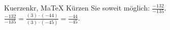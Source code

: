 \begin{MAufgabe}{Kuerzen}{kr, MaTeX}
K\"urzen Sie soweit m\"oglich: $\frac{-132}{-135}$.\\ 
\ifLsg\MLoesung
\quad $\frac{-132}{-135}=\frac{(3)\cdot(-44)}{(3)\cdot(-45)}=\frac{-44}{-45}$.\else\relax\fi
 \end{MAufgabe}